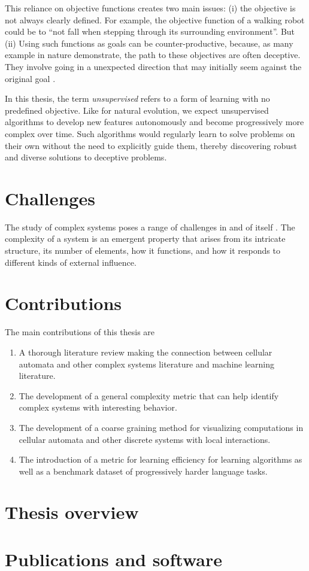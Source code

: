 This reliance on objective functions creates two main issues: (i) the objective
is not always clearly defined. For example, the objective function of a walking
robot could be to ``not fall when stepping through its surrounding
environment''. But (ii) Using such functions as goals can be counter-productive,
because, as many example in nature demonstrate, the path to these objectives are
often deceptive. They involve going in a unexpected direction that may initially
seem against the original goal \cite{stanleyWhyGreatnessCannot2015}.

In this thesis, the term \emph{unsupervised} refers to a form of learning with
no predefined objective. Like for natural evolution, we expect unsupervised
algorithms to develop new features autonomously and become progressively more
complex over time. Such algorithms would regularly learn to solve problems on
their own without the need to explicitly guide them, thereby discovering robust
and diverse solutions to deceptive problems.


\section{Challenges}

The study of complex systems poses a range of challenges in and of itself
\cite{sanmiguelChallengesComplexSystems2012}. The complexity of a system is an
emergent property that arises from its intricate structure, its number of
elements, how it functions, and how it responds to different kinds of external
influence.

\section{Contributions}

The main contributions of this thesis are
\begin{enumerate}
  \item A thorough literature review making the connection between cellular
        automata and other complex systems literature and machine learning
        literature.

  \item The development of a general complexity metric that can help identify
  complex systems with interesting behavior.

  \item The development of a coarse graining method for visualizing computations
        in cellular automata and other discrete systems with local interactions.

  \item The introduction of a metric for learning efficiency for learning
        algorithms as well as a benchmark dataset of progressively harder
        language tasks.
\end{enumerate}

\section{Thesis overview}

\section{Publications and software}
